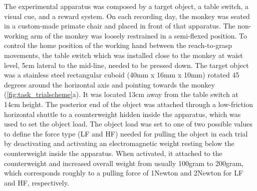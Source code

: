 {The experimental apparatus was composed by a target object, a table switch, a visual cue, and a reward system. On each recording day, the monkey was seated in a custom-made primate chair and placed in front of that apparatus. The non-working arm of the monkey was loosely restrained in a semi-flexed position. To control the home position of the working hand between the reach-to-grasp movements, the table switch which was installed close to the monkey at waist level, 5cm lateral to the mid-line, needed to be pressed down. The target object was a stainless steel rectangular cuboid (40mm x 16mm x 10mm) rotated 45 degrees around the horizontal axis and pointing towards the monkey (\cref{fig:task_trialscheme}a). It was located 13cm away from the table switch at 14cm height. The posterior end of the object was attached through a low-friction horizontal shuttle to a counterweight hidden inside the apparatus, which was used to set the object load. The object load was set to one of two possible values to define the force type (LF and HF) needed for pulling the object in each trial by deactivating and activating an electromagnetic weight resting below the counterweight inside the apparatus. When activated, it attached to the counterweight and increased overall weight from usually 100gram to 200gram, which corresponds roughly to a pulling force of 1Newton and 2Newton for LF and HF, respectively. 

}
